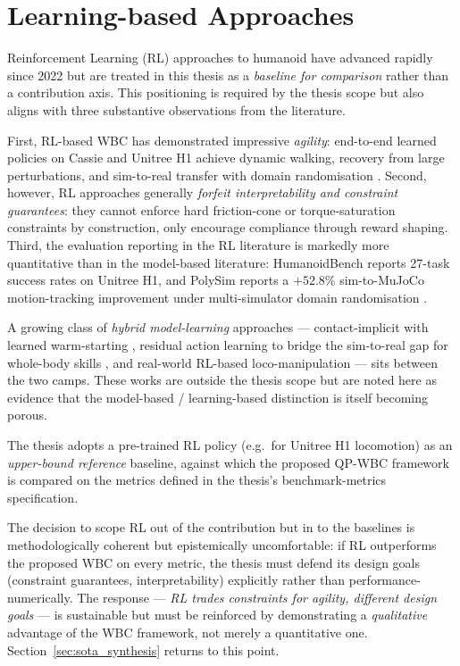 \section{Learning-based Approaches}
\label{sec:sota_rl}

Reinforcement Learning (RL) approaches to humanoid \WBC{} have advanced
rapidly since 2022 but are treated in this thesis as a \emph{baseline for
comparison} rather than a contribution axis. This positioning is required
by the thesis scope but also aligns with three substantive observations
from the literature.

First, RL-based WBC has demonstrated impressive \emph{agility}:
end-to-end learned policies on Cassie and Unitree H1 achieve dynamic
walking, recovery from large perturbations, and sim-to-real transfer
with domain randomisation
\cite{Radosavovic2024,HumanoidGym2024,PolySim2025}. Second, however, RL
approaches generally \emph{forfeit interpretability and constraint
guarantees}: they cannot enforce hard friction-cone or torque-saturation
constraints by construction, only encourage compliance through reward
shaping. Third, the evaluation reporting in the RL literature is markedly
more quantitative than in the model-based literature: HumanoidBench
\cite{Sferrazza2024} reports 27-task success rates on Unitree H1, and
PolySim reports a $+52.8\%$ sim-to-MuJoCo motion-tracking improvement
under multi-simulator domain randomisation \cite{PolySim2025}.

A growing class of \emph{hybrid model-learning} approaches ---
contact-implicit \MPC{} with learned warm-starting \cite{LeCleach2024},
residual action learning to bridge the sim-to-real gap for whole-body skills
\cite{ASAP2025}, and real-world RL-based loco-manipulation \cite{Radosavovic2024}
--- sits between the two camps. These works are outside the thesis scope but are
noted here as evidence that the model-based / learning-based distinction is
itself becoming porous.

The thesis adopts a pre-trained RL policy (e.g.\ for Unitree H1
locomotion) as an \emph{upper-bound reference} baseline, against which
the proposed QP-WBC framework is compared on the metrics defined in the
thesis's benchmark-metrics specification.

\begin{criticalinsight}
The decision to scope RL out of the contribution but in to the baselines
is methodologically coherent but epistemically uncomfortable: if RL
outperforms the proposed WBC on every metric, the thesis must defend its
design goals (constraint guarantees, interpretability) explicitly rather
than performance-numerically. The response --- \emph{RL trades constraints
for agility, different design goals} --- is sustainable but must be
reinforced by demonstrating a \emph{qualitative} advantage of the WBC
framework, not merely a quantitative one.
Section~\ref{sec:sota_synthesis} returns to this point.
\end{criticalinsight}


